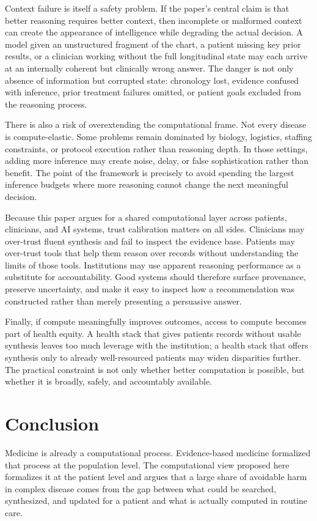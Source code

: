 \documentclass[11pt]{article}
\begin{document}
Context failure is itself a safety problem. If the paper's central claim is that better reasoning requires better context, then incomplete or malformed context can create the appearance of intelligence while degrading the actual decision. A model given an unstructured fragment of the chart, a patient missing key prior results, or a clinician working without the full longitudinal state may each arrive at an internally coherent but clinically wrong answer. The danger is not only absence of information but corrupted state: chronology lost, evidence confused with inference, prior treatment failures omitted, or patient goals excluded from the reasoning process.

There is also a risk of overextending the computational frame. Not every disease is compute-elastic. Some problems remain dominated by biology, logistics, staffing constraints, or protocol execution rather than reasoning depth. In those settings, adding more inference may create noise, delay, or false sophistication rather than benefit. The point of the framework is precisely to avoid spending the largest inference budgets where more reasoning cannot change the next meaningful decision.

Because this paper argues for a shared computational layer across patients, clinicians, and AI systems, trust calibration matters on all sides. Clinicians may over-trust fluent synthesis and fail to inspect the evidence base. Patients may over-trust tools that help them reason over records without understanding the limits of those tools. Institutions may use apparent reasoning performance as a substitute for accountability. Good systems should therefore surface provenance, preserve uncertainty, and make it easy to inspect how a recommendation was constructed rather than merely presenting a persuasive answer.

Finally, if compute meaningfully improves outcomes, access to compute becomes part of health equity. A health stack that gives patients records without usable synthesis leaves too much leverage with the institution; a health stack that offers synthesis only to already well-resourced patients may widen disparities further. The practical constraint is not only whether better computation is possible, but whether it is broadly, safely, and accountably available.

\section{Conclusion}
Medicine is already a computational process. Evidence-based medicine formalized that process at the population level. The computational view proposed here formalizes it at the patient level and argues that a large share of avoidable harm in complex disease comes from the gap between what could be searched, synthesized, and updated for a patient and what is actually computed in routine care.
\end{document}
